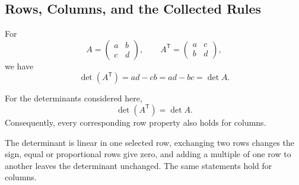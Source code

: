 \subsection{Rows, Columns, and the Collected Rules}

For
\[
A=\begin{pmatrix}a&b\\c&d\end{pmatrix},
\qquad
A^{\mathsf T}=\begin{pmatrix}a&c\\b&d\end{pmatrix},
\]
we have
\[
\det(A^{\mathsf T})=ad-cb=ad-bc=\det A.
\]

\begin{theorembox}
For the determinants considered here,
\[
\det(A^{\mathsf T})=\det A.
\]
Consequently, every corresponding row property also holds for columns.
\end{theorembox}

\begin{summarybox}
The determinant is linear in one selected row, exchanging two rows changes the sign, equal or proportional rows give zero, and adding a multiple of one row to another leaves the determinant unchanged. The same statements hold for columns.
\end{summarybox}
